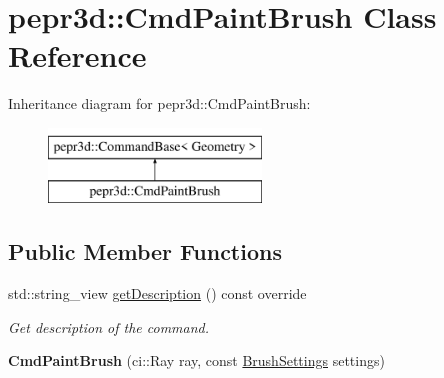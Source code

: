\hypertarget{classpepr3d_1_1_cmd_paint_brush}{}\section{pepr3d\+::Cmd\+Paint\+Brush Class Reference}
\label{classpepr3d_1_1_cmd_paint_brush}
Inheritance diagram for pepr3d\+::Cmd\+Paint\+Brush\+:\begin{figure}[H]
\begin{center}
\leavevmode
\includegraphics[height=2.000000cm]{classpepr3d_1_1_cmd_paint_brush}
\end{center}
\end{figure}
\subsection*{Public Member Functions}
\begin{DoxyCompactItemize}
\item 
\mbox{\label{classpepr3d_1_1_cmd_paint_brush_a3e2136c68fe1c36a812e576ead824d53}} 
std\+::string\+\_\+view \mbox{\hyperlink{classpepr3d_1_1_cmd_paint_brush_a3e2136c68fe1c36a812e576ead824d53}{get\+Description}} () const override
\begin{DoxyCompactList}\small\item\em Get description of the command. \end{DoxyCompactList}\item 
\mbox{\label{classpepr3d_1_1_cmd_paint_brush_a80458a030d3d002307414e17f89da621}} 
{\bfseries Cmd\+Paint\+Brush} (ci\+::\+Ray ray, const \mbox{\hyperlink{structpepr3d_1_1_brush_settings}{Brush\+Settings}} settings)
\end{DoxyCompactItemize}
